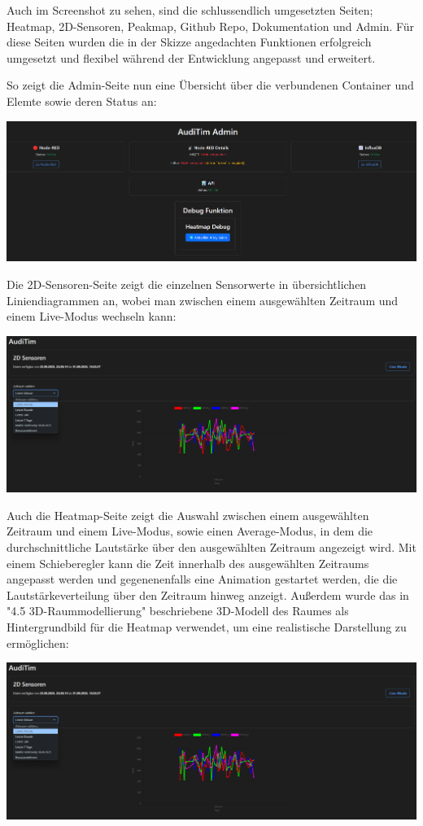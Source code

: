 Auch im Screenshot zu sehen, sind die schlussendlich umgesetzten Seiten; Heatmap, 2D-Sensoren, Peakmap, Github Repo, Dokumentation und Admin. 
Für diese Seiten wurden die in der Skizze angedachten Funktionen erfolgreich umgesetzt und flexibel während der Entwicklung angepasst und erweitert.

So zeigt die Admin-Seite nun eine Übersicht über die verbundenen Container und Elemte sowie deren Status an:
\begin{center}
  \includegraphics[width=1\textwidth]{../images/UI/admin.png}
\end{center}

Die 2D-Sensoren-Seite zeigt die einzelnen Sensorwerte in übersichtlichen Liniendiagrammen an, wobei man zwischen einem ausgewählten Zeitraum und einem Live-Modus wechseln kann:
\begin{center}
  \includegraphics[width=1\textwidth]{../images/UI/zweid.png}
\end{center}

Auch die Heatmap-Seite zeigt die Auswahl zwischen einem ausgewählten Zeitraum und einem Live-Modus, sowie einen Average-Modus, in dem die durchschnittliche Lautstärke über den ausgewählten Zeitraum angezeigt wird. 
Mit einem Schieberegler kann die Zeit innerhalb des ausgewählten Zeitraums angepasst werden und gegenenenfalls eine Animation gestartet werden, die die Lautstärkeverteilung über den Zeitraum hinweg anzeigt.
Außerdem wurde das in "4.5 3D-Raummodellierung" beschriebene 3D-Modell des Raumes als Hintergrundbild für die Heatmap verwendet, um eine realistische Darstellung zu ermöglichen:
\begin{center}
  \includegraphics[width=1\textwidth]{../images/UI/zweid.png}
\end{center}

